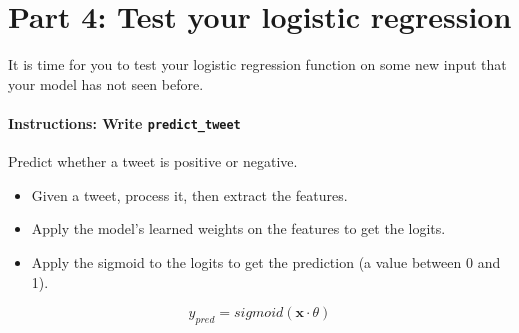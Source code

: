 \documentclass[11pt]{article}
\providecommand{\tightlist}{%
      \setlength{\itemsep}{0pt}\setlength{\parskip}{0pt}}
\begin{document}
    \hypertarget{part-4-test-your-logistic-regression}{%
\section{Part 4: Test your logistic
regression}\label{part-4-test-your-logistic-regression}}

It is time for you to test your logistic regression function on some new
input that your model has not seen before.

\hypertarget{instructions-write-predict_tweet}{%
\paragraph{\texorpdfstring{Instructions: Write
\texttt{predict\_tweet}}{Instructions: Write predict\_tweet}}\label{instructions-write-predict_tweet}}

Predict whether a tweet is positive or negative.

\begin{itemize}
\tightlist
\item
  Given a tweet, process it, then extract the features.
\item
  Apply the model's learned weights on the features to get the logits.
\item
  Apply the sigmoid to the logits to get the prediction (a value between
  0 and 1).
\end{itemize}

\[y_{pred} = sigmoid(\mathbf{x} \cdot \theta)\]
\end{document}
